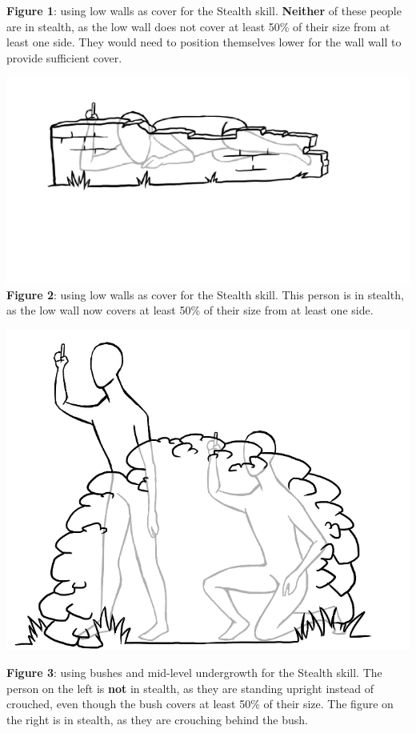 \textbf{Figure 1}: using low walls as cover for the Stealth skill. \textbf{Neither} of these people are in stealth, as the low wall does not cover at least 50\% of their size from at least one side. They would need to position themselves lower for the wall wall to provide sufficient cover.

\includegraphics[width=1\textwidth]{images/image3.png}\textbf{Figure 2}: using low walls as cover for the Stealth skill. This person is in stealth, as the low wall now covers at least 50\% of their size from at least one side.

\includegraphics[width=1\textwidth]{images/image4.png}

\textbf{Figure 3}: using bushes and mid-level undergrowth for the Stealth skill. The person on the left is \textbf{not} in stealth, as they are standing upright instead of crouched, even though the bush covers at least 50\% of their size. The figure on the right is in stealth, as they are crouching behind the bush.

